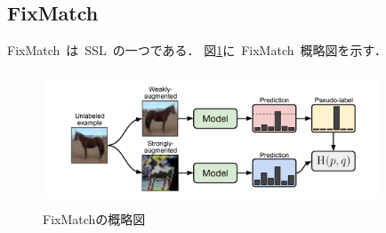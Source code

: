 \documentclass[twocolumn]{jarticle}     %
\begin{document}
\subsection{FixMatch}
FixMatch\cite{sohn2020fixmatch}\ は\ SSL\ の一つである．
図\ref{fig:daigram1}に\ FixMatch\ 概略図を示す．
\begin{figure}[h]
	\begin{center}
		\vspace*{-3mm}
		\hspace*{-8mm}
		\includegraphics[height=40mm,width=100mm]{1.PNG}
		\caption{FixMatch\cite{sohn2020fixmatch}の概略図\label{fig:daigram1}}
	\end{center}
\end{figure}
\end{document}
